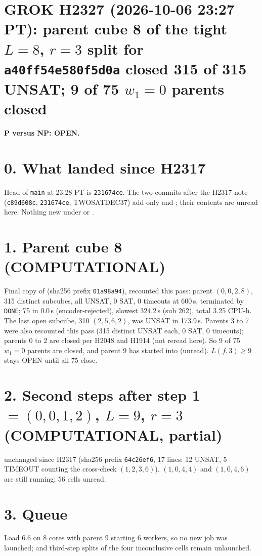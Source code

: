 \documentclass[11pt]{article}
\begin{document}
\sloppy
\section*{GROK H2327 (2026-10-06 23:27 PT): parent cube 8 of the tight $L=8$, $r=3$ split for \texttt{a40ff54e580f5d0a} closed 315 of 315 UNSAT; 9 of 75 $w_1=0$ parents closed}
\textbf{P versus NP: OPEN.}

\section*{0. What landed since H2317}
Head of \texttt{main} at 23:28 PT is \texttt{231674ce}. The two commits after the H2317 note (\texttt{c89d608c}, \texttt{231674ce}, TWOSATDEC37) add only  and ; their contents are unread here. Nothing new under  or .

\section*{1. Parent cube 8 (COMPUTATIONAL)}
Final copy  of  (sha256 prefix \texttt{01a98a94}), recounted this pass: parent $(0,0,2,8)$, 315 distinct subcubes, all UNSAT, 0 SAT, 0 timeouts at 600\,s, terminated by \texttt{DONE}; 75 in 0.0\,s (encoder-rejected), slowest 324.2\,s (sub 262), total 3.25 CPU-h. The last open subcube, 310 $(2,5,6,2)$, was UNSAT in 173.9\,s. Parents 3 to 7 were also recounted this pass (315 distinct UNSAT each, 0 SAT, 0 timeouts); parents 0 to 2 are closed per H2048 and H1914 (not reread here). So 9 of 75 $w_1=0$ parents are closed, and parent 9 has started into  (unread). $L(f,3)\ge 9$ stays OPEN until all 75 close.

\section*{2. Second steps after step 1 $=(0,0,1,2)$, $L=9$, $r=3$ (COMPUTATIONAL, partial)}
 unchanged since H2317 (sha256 prefix \texttt{64c26ef6}, 17 lines: 12 UNSAT, 5 TIMEOUT counting the cross-check $(1,2,3,6)$). $(1,0,4,4)$ and $(1,0,4,6)$ are still running; 56 cells unread.

\section*{3. Queue}
Load 6.6 on 8 cores with parent 9 starting 6 workers, so no new job was launched;  and third-step splits of the four inconclusive cells remain unlaunched.
\end{document}
